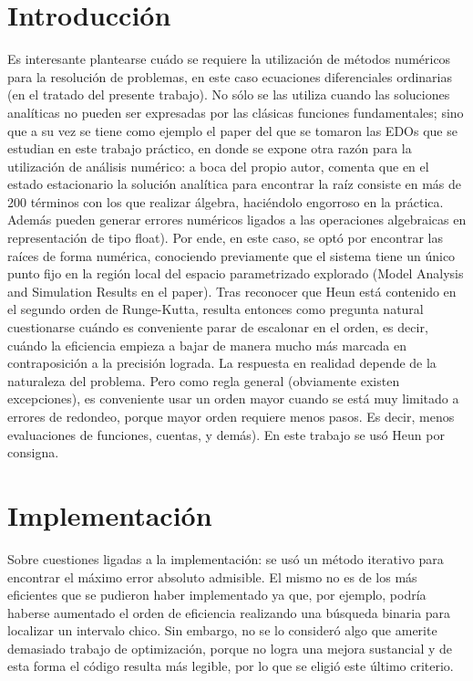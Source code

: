 \section{Introducci\'on}

Es interesante plantearse cu\'ado se requiere la utilizaci\'on de m\'etodos num\'ericos para la resolución de problemas, en este caso ecuaciones diferenciales ordinarias (en el tratado del presente trabajo). No sólo se las utiliza cuando las soluciones analíticas no pueden ser expresadas por las clásicas funciones fundamentales; sino que a su vez se tiene como ejemplo el paper del que se tomaron las EDOs que se estudian en este trabajo práctico, en donde se expone otra razón para la utilización de análisis numérico: a boca del propio autor, comenta que en el estado estacionario la solución analítica para encontrar la raíz consiste en más de 200 términos con los que realizar álgebra, haciéndolo engorroso en la práctica. Además pueden generar errores numéricos ligados a las operaciones algebraicas en representación de tipo float). Por ende, en este caso, se optó por encontrar las raíces de forma numérica, conociendo previamente que el sistema tiene un único punto fijo en la región local del espacio parametrizado explorado (Model Analysis and Simulation Results en el paper).
Tras reconocer que Heun está contenido en el segundo orden de Runge-Kutta, resulta entonces como pregunta natural cuestionarse cuándo es conveniente parar de escalonar en el orden, es decir, cuándo la eficiencia empieza a bajar de manera mucho más marcada en contraposición a la precisión lograda. La respuesta en realidad depende de la naturaleza del problema. Pero como regla general (obviamente existen excepciones), es conveniente usar un orden mayor cuando se está muy limitado a errores de redondeo, porque mayor orden requiere menos pasos. Es decir, menos evaluaciones de funciones, cuentas, y demás). En este trabajo se usó Heun por consigna.


\section{Implementaci\'on}

Sobre cuestiones ligadas a la implementación: se usó un método iterativo para encontrar el máximo error absoluto admisible. El mismo no es de los más eficientes que se pudieron haber implementado ya que, por ejemplo, podría haberse aumentado el orden de eficiencia realizando una búsqueda binaria para localizar un intervalo chico. Sin embargo, no se lo consider\'o algo que amerite demasiado trabajo de optimización, porque no logra una mejora sustancial y de esta forma el código resulta más legible, por lo que se eligió este último criterio.

